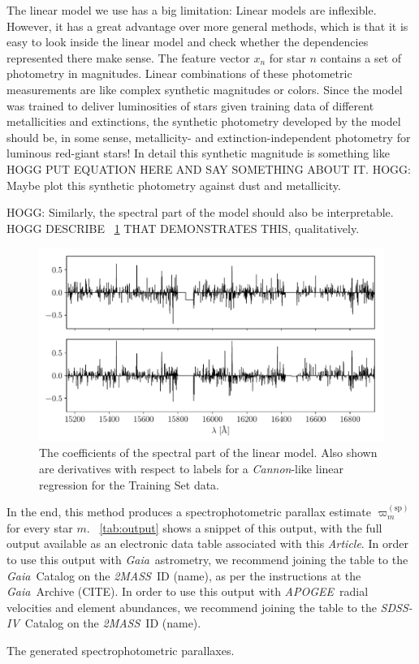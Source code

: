 \documentclass[modern]{aastex62}
\newcommand{\documentname}{\textsl{Article}}
\newcommand{\acronym}[1]{{\small{#1}}}
\newcommand{\project}[1]{\textsl{#1}}
\newcommand{\apogee}{\project{\acronym{APOGEE}}}
\newcommand{\gaia}{\project{Gaia}}
\newcommand{\zmass}{\project{\acronym{2MASS}}}
\newcommand{\sdssiv}{\project{\acronym{SDSS-IV}}}
\newcommand{\sparallax}{\varpi^{(\mathrm{sp})}}
\begin{document}
The linear model we use has a big limitation: Linear models are inflexible.
However, it has a great advantage over more general methods,
which is that it is easy to look inside
the linear model and check whether the dependencies represented there make sense.
The feature vector $x_n$ for star $n$
contains a set of photometry in magnitudes.
Linear combinations of these photometric measurements are like complex synthetic
magnitudes or colors.
Since the model was trained to deliver luminosities of stars given training data
of different metallicities and extinctions, the synthetic photometry developed
by the model should be, in some sense, metallicity- and extinction-independent
photometry for luminous red-giant stars!
In detail this synthetic magnitude is something like HOGG PUT EQUATION HERE AND
SAY SOMETHING ABOUT IT. HOGG: Maybe plot this synthetic photometry against dust
and metallicity.

HOGG: Similarly, the spectral part of the model should also be
interpretable. HOGG DESCRIBE \figurename~\ref{fig:spectral} THAT
DEMONSTRATES THIS, qualitatively.
\begin{figure}
\includegraphics[width=\textwidth]{coefficients.pdf}
\caption{The coefficients of the spectral part of the linear model.
  Also shown are derivatives with respect to labels for a \project{Cannon}-like
  linear regression for the Training Set data.\label{fig:spectral}}
\end{figure}

In the end, this method produces a spectrophotometric parallax estimate $\sparallax_m$ for
every star $m$.
\tablename~\ref{tab:output} shows a snippet of this output, with the full output available
as an electronic data table associated with this \documentname.
In order to use this output with \gaia\ astrometry, we recommend joining the table to the
\gaia\ Catalog on the \zmass\ ID (name), as per the instructions at the \gaia\ Archive (CITE).
In order to use this output with \apogee\ radial velocities and element abundances, we recommend
joining the table to the \sdssiv\ Catalog on the \zmass\ ID (name).
\begin{table}
\caption{The generated spectrophotometric parallaxes.\label{tab:output}}
\end{table}
\end{document}
